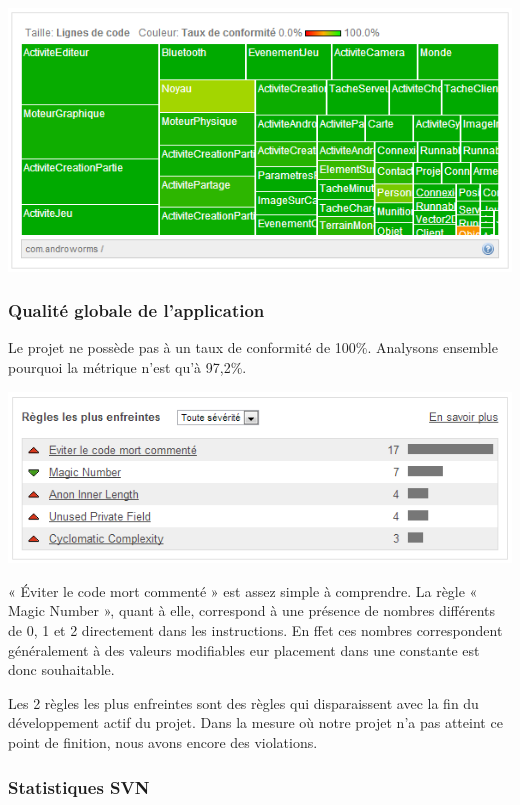 \documentclass{report}
\begin{document}
\begin{center}
\includegraphics[scale=0.8]{images/state2}
\end{center}

\subsubsection{Qualité globale de l’application}

Le projet ne possède pas à un taux de conformité de 100\%. Analysons
ensemble pourquoi la  métrique n’est qu’à 97,2\%.


\includegraphics[scale=0.75]{images/rules}

« Éviter le code mort commenté » est assez simple à comprendre. La
règle « Magic Number », quant à elle, correspond à une présence de
nombres différents de 0, 1 et 2 directement dans les instructions. En
ffet ces nombres correspondent généralement à des valeurs modifiables
eur placement dans une constante est donc souhaitable.

Les 2 règles les plus enfreintes sont des règles qui disparaissent avec
la fin du développement actif du projet. Dans la mesure où notre projet
n’a pas atteint ce point de finition, nous avons encore des violations.

\subsubsection{Statistiques SVN}
\end{document}
